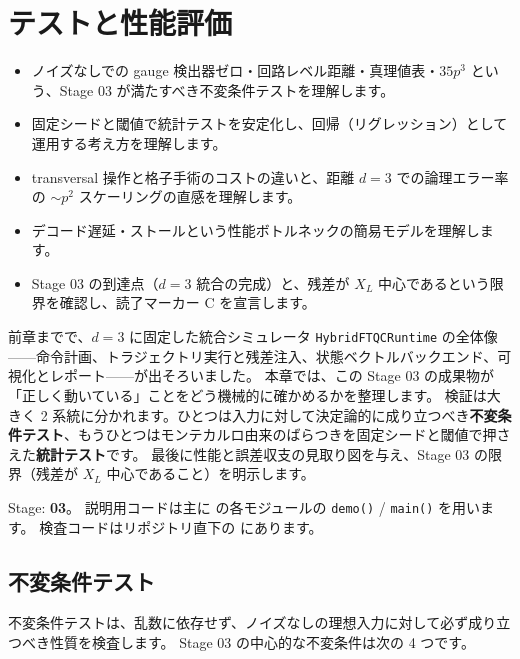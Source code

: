 \chapter{テストと性能評価}\label{ch:testing_perf}

\begin{chaptergoal}
  \begin{itemize}
  \item ノイズなしでの gauge 検出器ゼロ・回路レベル距離・真理値表・$35p^3$ という、Stage 03 が満たすべき不変条件テストを理解します。
  \item 固定シードと閾値で統計テストを安定化し、回帰（リグレッション）として運用する考え方を理解します。
  \item transversal 操作と格子手術のコストの違いと、距離 $d=3$ での論理エラー率の $\sim p^2$ スケーリングの直感を理解します。
  \item デコード遅延・ストールという性能ボトルネックの簡易モデルを理解します。
  \item Stage 03 の到達点（$d=3$ 統合の完成）と、残差が $X_L$ 中心であるという限界を確認し、読了マーカー C を宣言します。
  \end{itemize}
\end{chaptergoal}

前章までで、$d=3$ に固定した統合シミュレータ \texttt{HybridFTQCRuntime} の全体像——命令計画、トラジェクトリ実行と残差注入、状態ベクトルバックエンド、可視化とレポート——が出そろいました。
本章では、この Stage 03 の成果物が「正しく動いている」ことをどう機械的に確かめるかを整理します。
検証は大きく 2 系統に分かれます。ひとつは入力に対して決定論的に成り立つべき\textbf{不変条件テスト}、もうひとつはモンテカルロ由来のばらつきを固定シードと閾値で押さえた\textbf{統計テスト}です。
最後に性能と誤差収支の見取り図を与え、Stage 03 の限界（残差が $X_L$ 中心であること）を明示します。

\begin{notebox}
  Stage: \textbf{03}。
  説明用コードは主に  の各モジュールの \texttt{demo()} / \texttt{main()} を用います。
  検査コードはリポジトリ直下の  にあります。
\end{notebox}

\section{不変条件テスト}\label{sec:invariants}

不変条件テストは、乱数に依存せず、ノイズなしの理想入力に対して必ず成り立つべき性質を検査します。
Stage 03 の中心的な不変条件は次の 4 つです。

